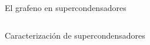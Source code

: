 \documentclass[aspectratio=169]{beamer}
\begin{document}
	\begin{frame}{El grafeno en supercondensadores}
		\begin{columns}
			\begin{column}{0.5\textwidth}
				
			\end{column}
			\begin{column}{0.5\textwidth}

			\end{column}
		\end{columns}
	\end{frame}

	\begin{frame}{Caracterización de supercondensadores}
		\begin{columns}
			\begin{column}{0.5\textwidth}

			\end{column}
			\begin{column}{0.5\textwidth}

			\end{column}
		\end{columns}
	\end{frame}
%				
%				
%				
%				
%				
%				
%				
%				
%				
%				
%				
%				
%				
%				
\end{document}
